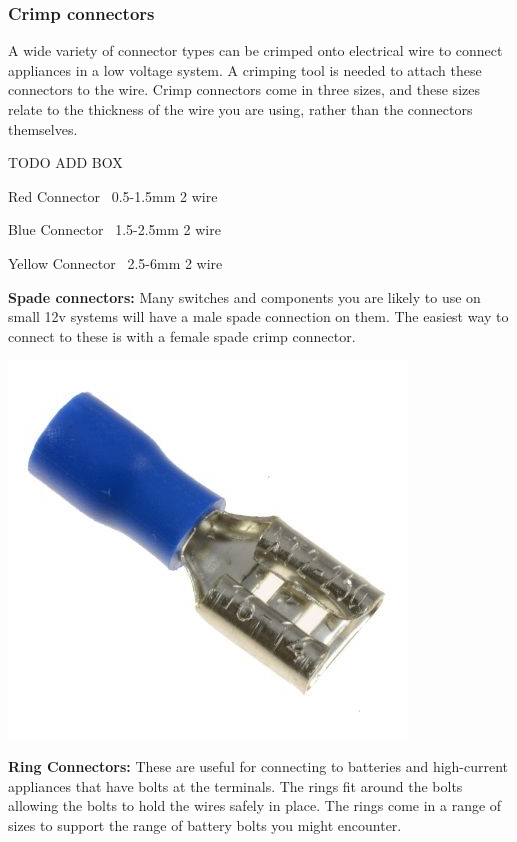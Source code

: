 \documentclass{article}
\theoremstyle{definition}
\theoremstyle{definition}
\theoremstyle{remark}
\begin{document}

    \subsubsection{Crimp connectors} %
    \label{ssub:crimp_connectors}

      A wide variety of connector types can be crimped onto electrical wire to connect appliances in a low voltage system. A crimping tool is needed to attach these connectors to the wire. Crimp connectors come in three sizes, and these sizes relate to the thickness of the wire you are using, rather than the connectors themselves.

      TODO ADD BOX

      Red Connector  0.5-1.5mm 2  wire

      Blue Connector  1.5-2.5mm 2  wire

      Yellow Connector  2.5-6mm 2  wire

      \textbf{Spade connectors:} Many switches and components you are likely to use on small 12v systems will have a male spade connection on them. The easiest way to connect to these is with a female spade crimp connector.  
    
      \begin{center}
        \includegraphics[width=0.15\paperwidth]{../Images/image_8_4_(spade_connector).png}
      \end{center}

      \textbf{Ring Connectors:} These are useful for connecting to batteries and high-current appliances that have bolts at the terminals. The rings fit around the bolts allowing the bolts to hold the wires safely in place. The rings come in a range of sizes to support the range of battery bolts you might encounter.
    
\end{document}
